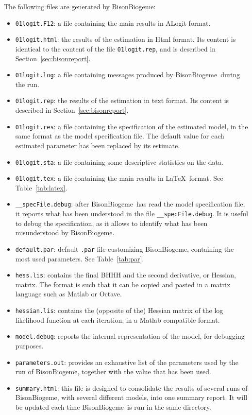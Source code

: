 \documentclass[12pt,a4paper]{article}
\newcommand{\BBIOGEME}{BisonBiogeme}
\begin{document}
The following files are generated by \BBIOGEME:
\begin{itemize}
\item \lstinline$01logit.F12$: a file containing the main results in ALogit format.
\item \lstinline$01logit.html$: the results of the estimation in Html
  format. Its content is identical to the content of the file
  \lstinline$01logit.rep$, and is described in Section~\ref{sec:bisonreport}.
\item \lstinline$01logit.log$: a file containing messages produced by \BBIOGEME\ during the run.
\item \lstinline$01logit.rep$: the results of the estimation in text
  format. Its content is described in Section~\ref{sec:bisonreport}.
\item \lstinline$01logit.res$: a file containing the specification of
  the estimated model, in the same format as the model specification
  file. The default value for each estimated parameter has been
  replaced by its estimate. 
\item \lstinline$01logit.sta$:  a file containing some descriptive statistics on the data.
\item \lstinline$01logit.tex$: a file containing the main results in
  \LaTeX\ format. See Table~\ref{tab:latex}.
\item \lstinline$__specFile.debug$: after \BBIOGEME\ has read the
  model specification file, it reports what has been understood in the
  file \lstinline$__specFile.debug$. It is useful to debug the
  specification, as it allows to identify what has been misunderstood
  by \BBIOGEME.
\item \lstinline$default.par$: default \lstinline$.par$ file
  customizing \BBIOGEME, containing the most used parameters. See Table~\ref{tab:par}.
\item \lstinline$hess.lis$: contains the final BHHH and the second
  derivative, or Hessian, matrix. The format is such that it can be
  copied and pasted in a matrix language such as Matlab or Octave. 
\item \lstinline$hessian.lis$: contains the (opposite of the) Hessian
  matrix of the log likelihood function at each iteration, in a Matlab
  compatible format. 
\item \lstinline$model.debug$: reports the internal representation of
  the model, for debugging purposes. 
\item \lstinline$parameters.out$: provides an exhaustive list of the
  parameters used by the run of \BBIOGEME, together with the value
  that has been used. 
\item \lstinline$summary.html$: this file is designed to consolidate
  the results of several runs of \BBIOGEME, with several different
  models, into one summary report. It will be updated each time
  \BBIOGEME\ is run in the same directory. 
\end{itemize}
\end{document}
